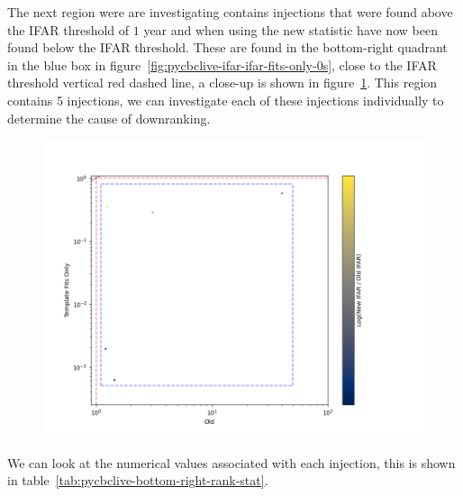The next region were are investigating contains injections that were found above the IFAR threshold of $1$ year and when using the new statistic have now been found below the IFAR threshold. These are found in the bottom-right quadrant in the blue box in figure~\ref{fig:pycbclive-ifar-ifar-fits-only-0s}, close to the IFAR threshold vertical red dashed line, a close-up is shown in figure~\ref{fig:pycbclive-bottom-right-region}. This region contains 5 injections, we can investigate each of these injections individually to determine the cause of downranking.
%
\begin{figure}
       \centering
    \includegraphics[width=1\textwidth]{images/5_pycbclive/prev_found_ifar_vs_ifar_region.png}
    \caption{}
    \label{fig:pycbclive-bottom-right-region}
\end{figure}
%
We can look at the numerical values associated with each injection, this is shown in table~\ref{tab:pycbclive-bottom-right-rank-stat}.
%
